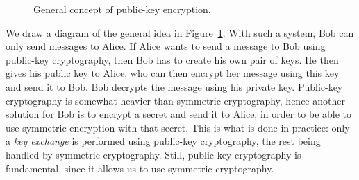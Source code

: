 \begin{figure}[h]
  \caption{General concept of public-key encryption.}
  \label{fig:crypto-asym}
\end{figure}
We draw a diagram of the general idea in Figure~\ref{fig:crypto-asym}. With such
a system, Bob can only send messages to Alice. If Alice wants to send a message
to Bob using public-key cryptography, then Bob has to create his own pair of
keys. He then gives his public key to Alice, who can then encrypt her message
using this key and send it to Bob. Bob decrypts the message using his private
key. Public-key cryptography is somewhat heavier than symmetric
cryptography, hence another solution for Bob is to encrypt a secret and send it
to Alice, in order to be able to use symmetric encryption with that secret. This
is what is done in practice: only a \emph{key exchange} is performed using
public-key cryptography, the rest being handled by symmetric cryptography.
Still, public-key cryptography is fundamental, since it allows us to use
symmetric cryptography.

